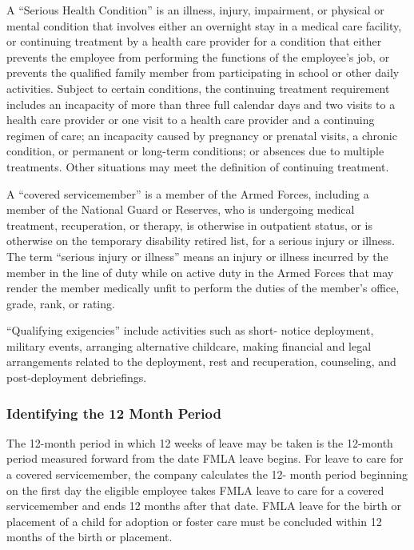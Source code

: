 \documentclass{book}
\begin{document}
A “Serious Health Condition” is an illness, injury, impairment, or physical or mental condition that involves either an overnight stay in a medical care facility, or continuing treatment by a health care provider for a condition that either prevents the employee from performing the functions of the employee's job, or prevents the qualified family member from participating in school or other daily activities. Subject to certain conditions, the continuing treatment requirement includes an incapacity of more than three full calendar days and two visits to a health care provider or one visit to a health care provider and a continuing regimen of care; an incapacity caused by pregnancy or prenatal visits, a chronic condition, or permanent or long-term conditions; or absences due to multiple treatments. Other situations may meet the definition of continuing treatment.

A “covered servicemember” is a member of the Armed Forces, including a member of the National Guard or Reserves, who is undergoing medical treatment, recuperation, or therapy, is otherwise in outpatient status, or is otherwise on the temporary disability retired list, for a serious injury or illness. The term “serious injury or illness” means an injury or illness incurred by the member in the line of duty while on active duty in the Armed Forces that may render the member medically unfit to perform the duties of the member's office, grade, rank, or rating.

“Qualifying exigencies” include activities such as short- notice deployment, military events, arranging alternative childcare, making financial and legal arrangements related to the deployment, rest and recuperation, counseling, and post-deployment debriefings.

\subsubsection{Identifying the 12 Month Period}

The 12-month period in which 12 weeks of leave may be taken is the 12-month period measured forward from the date FMLA leave begins. For leave to care for a covered servicemember, the company calculates the 12- month period beginning on the first day the eligible employee takes FMLA leave to care for a covered servicemember and ends 12 months after that date. FMLA leave for the birth or placement of a child for adoption or foster care must be concluded within 12 months of the birth or placement.
\end{document}
